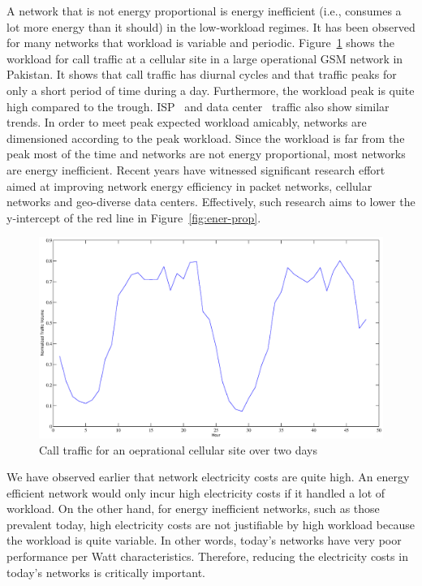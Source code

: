 A network that is not energy proportional is energy inefficient (i.e., consumes a lot more energy than it should) in the low-workload regimes. It has been observed for many networks that workload is variable and periodic. Figure~\ref{fig:varwork} shows the workload for call traffic at a cellular site in a large operational GSM network in Pakistan. It shows that call traffic has diurnal cycles and that traffic peaks for only a short period of time during a day. Furthermore, the workload peak is quite high compared to the trough. ISP~\cite{1248656} and data center~\cite{10.1109/MC.2007.443} traffic also show similar trends. In order to meet peak expected workload amicably, networks are dimensioned according to the peak workload. Since the workload is far from the peak most of the time and networks are not energy proportional, most networks are energy inefficient. Recent years have witnessed significant research effort aimed at improving network energy efficiency in packet networks, cellular networks and geo-diverse data centers. Effectively, such research aims to lower the y-intercept of the red line in Figure~\ref{fig:ener-prop}. 

\begin{figure}
\includegraphics[width=1\textwidth]{pics/waridworkload.eps}
\caption{Call traffic for an oeprational cellular site over two days}
\label{fig:varwork}
\end{figure} 

We have observed earlier that network electricity costs are quite high. An energy efficient network would only incur high electricity costs if it handled a lot of workload. On the other hand, for energy inefficient networks, such as those prevalent today, high electricity costs are not justifiable by high workload because the workload is quite variable. In other words, today's networks have very poor performance per Watt characteristics. Therefore, reducing the electricity costs in today's networks is critically important.  


